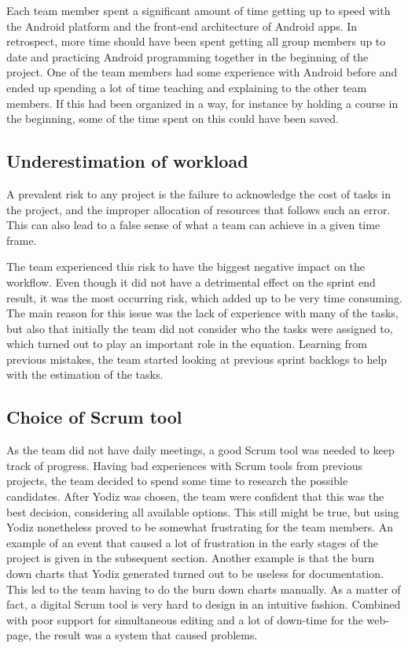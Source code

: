  Each team member spent a significant amount of time getting up to speed with the Android platform and the front-end architecture of Android apps. In retrospect, more time should have been spent getting all group members up to date and practicing Android programming together in the beginning of the project. One of the team members had some experience with Android before and ended up spending a lot of time teaching and explaining to the other team members. If this had been organized in a way, for instance by holding a course in the beginning, some of the time spent on this could have been saved.

\subsection{Underestimation of workload}
A prevalent risk to any project is the failure to acknowledge the cost of tasks in the project, and the improper allocation of resources that follows such an error. This can also lead to a false sense of what a team can achieve in a given time frame. 

The team experienced this risk to have the biggest negative impact on the workflow. Even though it did not have a detrimental effect on the sprint end result, it was the most occurring risk, which added up to be very time consuming. The main reason for this issue was the lack of experience with many of the tasks, but also that initially the team did not consider who the tasks were assigned to, which turned out to play an important role in the equation. Learning from previous mistakes, the team started looking at previous sprint backlogs to help with the estimation of the tasks.

\subsection{Choice of Scrum tool}
\label{sec:choiceScrumTool}
As the team did not have daily meetings, a good Scrum tool was needed to keep track of progress. Having bad experiences with Scrum tools from previous projects, the team decided to spend some time to research the possible candidates. After Yodiz was chosen, the team were confident that this was the best decision, considering all available options. This still might be true, but using Yodiz nonetheless proved to be somewhat frustrating for the team members. An example of an event that caused a lot of frustration in the early stages of the project is given in the subsequent section. Another example is that the burn down charts that Yodiz generated turned out to be useless for documentation. This led to the team having to do the burn down charts manually. As a matter of fact, a digital Scrum tool is very hard to design in an intuitive fashion. Combined with poor support for simultaneous editing and a lot of down-time for the web-page, the result was a system that caused problems. 

